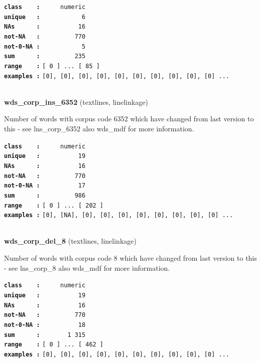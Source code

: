 \documentclass[]{article}
\begin{document}
\textbf{\texttt{class\ \ \ \ :}} \texttt{~~~~~numeric}\\
\textbf{\texttt{unique\ \ \ :}} \texttt{~~~~~~~~~~~6}\\
\textbf{\texttt{NAs\ \ \ \ \ \ :}} \texttt{~~~~~~~~~~16}\\
\textbf{\texttt{not-NA\ \ \ :}} \texttt{~~~~~~~~~770}\\
\textbf{\texttt{not-0-NA\ :}} \texttt{~~~~~~~~~~~5}\\
\textbf{\texttt{sum\ \ \ \ \ \ :}} \texttt{~~~~~~~~~235}\\
\textbf{\texttt{range\ \ \ \ :}}
\texttt{{[}\ 0\ {]}\ ...\ {[}\ 85\ {]}}\\
\textbf{\texttt{examples\ :}}
\texttt{{[}0{]},\ {[}0{]},\ {[}0{]},\ {[}0{]},\ {[}0{]},\ {[}0{]},\ {[}0{]},\ {[}0{]},\ {[}0{]},\ {[}0{]}\ ...}\\

~

\textbf{wds\_corp\_ins\_6352} (textlines, linelinkage)

Number of words with corpus code 6352 which have changed from last
version to this - see lns\_corp\_6352 also wds\_mdf for more
information.

\textbf{\texttt{class\ \ \ \ :}} \texttt{~~~~~numeric}\\
\textbf{\texttt{unique\ \ \ :}} \texttt{~~~~~~~~~~19}\\
\textbf{\texttt{NAs\ \ \ \ \ \ :}} \texttt{~~~~~~~~~~16}\\
\textbf{\texttt{not-NA\ \ \ :}} \texttt{~~~~~~~~~770}\\
\textbf{\texttt{not-0-NA\ :}} \texttt{~~~~~~~~~~17}\\
\textbf{\texttt{sum\ \ \ \ \ \ :}} \texttt{~~~~~~~~~986}\\
\textbf{\texttt{range\ \ \ \ :}}
\texttt{{[}\ 0\ {]}\ ...\ {[}\ 202\ {]}}\\
\textbf{\texttt{examples\ :}}
\texttt{{[}0{]},\ {[}NA{]},\ {[}0{]},\ {[}0{]},\ {[}0{]},\ {[}0{]},\ {[}0{]},\ {[}0{]},\ {[}0{]},\ {[}0{]}\ ...}\\

~

\textbf{wds\_corp\_del\_8} (textlines, linelinkage)

Number of words with corpus code 8 which have changed from last version
to this - see lns\_corp\_8 also wds\_mdf for more information.

\textbf{\texttt{class\ \ \ \ :}} \texttt{~~~~~numeric}\\
\textbf{\texttt{unique\ \ \ :}} \texttt{~~~~~~~~~~19}\\
\textbf{\texttt{NAs\ \ \ \ \ \ :}} \texttt{~~~~~~~~~~16}\\
\textbf{\texttt{not-NA\ \ \ :}} \texttt{~~~~~~~~~770}\\
\textbf{\texttt{not-0-NA\ :}} \texttt{~~~~~~~~~~18}\\
\textbf{\texttt{sum\ \ \ \ \ \ :}} \texttt{~~~~~~~1~315}\\
\textbf{\texttt{range\ \ \ \ :}}
\texttt{{[}\ 0\ {]}\ ...\ {[}\ 462\ {]}}\\
\textbf{\texttt{examples\ :}}
\texttt{{[}0{]},\ {[}0{]},\ {[}0{]},\ {[}0{]},\ {[}0{]},\ {[}0{]},\ {[}0{]},\ {[}0{]},\ {[}0{]},\ {[}0{]}\ ...}\\
\end{document}
